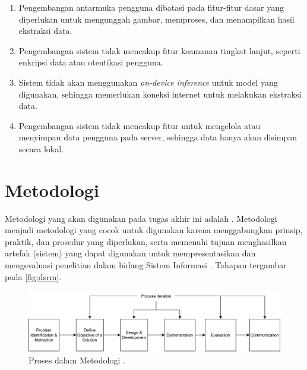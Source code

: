 \begin{enumerate}
	\item Pengembangan antarmuka pengguna dibatasi pada fitur-fitur dasar yang diperlukan untuk mengunggah gambar, memproses, dan menampilkan hasil ekstraksi data.
	\item Pengembangan sistem tidak mencakup fitur keamanan tingkat lanjut, seperti enkripsi data atau otentikasi pengguna.
	\item Sistem tidak akan menggunakan \emph{on-device inference} untuk model \dl{} yang digunakan, sehingga memerlukan koneksi internet untuk melakukan ekstraksi data.
	\item Pengembangan sistem tidak mencakup fitur untuk mengelola atau menyimpan data pengguna pada server, sehingga data hanya akan disimpan secara lokal.
\end{enumerate}

\section{Metodologi}
\label{sec:metodologi}

Metodologi yang akan digunakan pada tugas akhir ini adalah \dsrmfull. Metodologi \dsrm{} menjadi metodologi yang cocok untuk digunakan karena menggabungkan prinsip, praktik, dan prosedur yang diperlukan, serta memenuhi tujuan menghasilkan artefak (sistem) yang dapat digunakan untuk mempresentasikan dan mengevaluasi penelitian dalam bidang Sistem Informasi \parencite{peffers2007dsrm}. Tahapan \dsrm{} tergambar pada \autoref{fig:dsrm}.

\begin{figure}[htbp]
	\centering
	\includegraphics[width=.8\textwidth]{images/dsrm.png}
	\caption{Proses dalam Metodologi \dsrm{} \parencite{peffers2007dsrm}.}
	\label{fig:dsrm}
\end{figure}

\newpage

